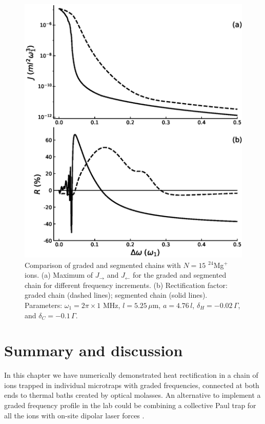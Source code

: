 \begin{figure}
  \center
  \includegraphics[width=0.75\linewidth]{Figures/24Mg_Comparacion_Graded_AND_Segmented.eps}
  \caption{Comparison of graded and segmented chains with $N=15$ $^{24}$Mg$^+$ ions. (a) Maximum
  of $J_\rightarrow$ and $J_\leftarrow$
   for the graded and segmented chain for different frequency increments. (b) Rectification factor: graded chain (dashed lines); segmented chain (solid lines). Parameters: $\omega_1 = 2 \pi \times 1$ MHz, $l = 5.25\,\mu$m, $a = 4.76 \, l$, $\delta_H = -0.02 \, \Gamma$, and $\delta_C = -0.1 \, \Gamma$.}
  \label{fig:GS}
\end{figure}

\section{Summary and discussion\label{sec:chapter5_Conclusions}}
%
In this chapter we have numerically demonstrated heat rectification in a chain of ions trapped in individual microtraps with graded frequencies, connected at both ends to thermal baths
created by optical molasses. An alternative to implement a graded
frequency profile in the lab
could be combining a collective Paul trap for all the ions with on-site dipolar laser forces \cite{Freitas2015,Enderlein2012,Bermudez2013,Schneider2010}.

